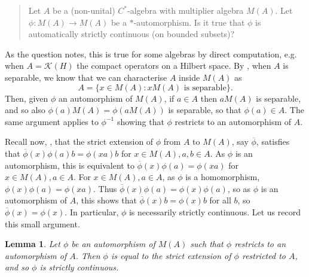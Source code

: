 \documentclass[a4paper,12pt]{article}
\theoremstyle{plain}
\newtheorem{lemma}[proposition]{Lemma}
\theoremstyle{definition}
\newcommand{\mc}[1]{\mathcal{#1}}
\begin{document}
\begin{quote}
Let $A$ be a (non-unital) $C^*$-algebra with multiplier algebra $M(A)$.  Let $\phi:M(A)\rightarrow M(A)$
be a $*$-automorphism.  Is it true that $\phi$ is automatically strictly continuous (on bounded subsets)?
\end{quote}

As the question notes, this is true for some algebras by direct computation, e.g. when $A=\mc K(H)$ the
compact operators on a Hilbert space.  By \cite[Proposition~1.1]{w1}, when $A$ is separable, we know that
we can characterise $A$ inside $M(A)$ as
\[ A = \{ x\in M(A) : x M(A) \text{ is separable} \}. \]
Then, given $\phi$ an automorphism of $M(A)$, if $a\in A$ then $aM(A)$ is separable, and so also
$\phi(a) M(A) = \phi(a M(A))$ is separable, so that $\phi(a)\in A$.  The same argument applies to
$\phi^{-1}$ showing that $\phi$ restricts to an automorphism of $A$.

Recall now, \cite[Chapter~2]{lance}, that the strict extension of $\phi$ from $A$ to $M(A)$,
say $\overline\phi$, satisfies
that $\overline\phi(x) \phi(a) b = \phi(xa) b$ for $x\in M(A), a,b\in A$.  As $\phi$ is an automorphism,
this is equivalent to $\overline\phi(x) \phi(a) = \phi(xa)$ for $x\in M(A), a\in A$.  For $x\in M(A),
a\in A$, as $\phi$ is a homomorphism, $\phi(x) \phi(a) = \phi(xa)$.  Thus $\overline\phi(x)\phi(a)
= \phi(x)\phi(a)$, so as $\phi$ is an automorphism of $A$, this shows that $\overline\phi(x)b=\phi(x)b$
for all $b$, so $\overline\phi(x) = \phi(x)$.  In particular, $\phi$ is necessarily strictly continuous.
Let us record this small argument.

\begin{lemma}\label{lem:from_A_to_strict}
Let $\phi$ be an automorphism of $M(A)$ such that $\phi$ restricts to an automorphism of $A$.  Then
$\phi$ is equal to the strict extension of $\phi$ restricted to $A$, and so $\phi$ is strictly continuous.
\end{lemma}
\end{document}
